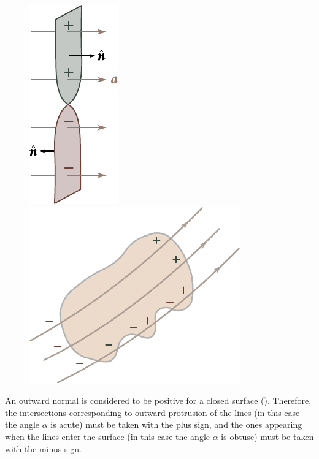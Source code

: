 \begin{figure}[t]
	\begin{minipage}[t]{0.4\linewidth}
		\begin{center}
			\includegraphics[scale=0.95]{figures/ch_01/fig_1_21.pdf}
			\caption[]{}
			\label{fig:1_21}
		\end{center}
	\end{minipage}
	\hspace{-0.05cm}
	\begin{minipage}[t]{0.6\linewidth}
		\begin{center}
			\includegraphics[scale=0.95]{figures/ch_01/fig_1_22.pdf}
			\caption[]{}
			\label{fig:1_22}
		\end{center}
	\end{minipage}
\vspace{-0.4cm}
\end{figure}

An outward normal is considered to be positive for a closed surface (). Therefore, the intersections corresponding to outward protrusion of the lines (in this case the angle $\alpha$ is acute) must be taken with the plus sign, and the ones appearing when the lines enter the surface (in this case the angle $\alpha$ is obtuse) must be taken with the minus sign.

